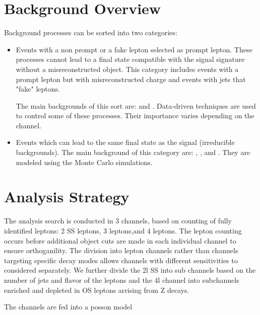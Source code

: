 \section{Background Overview}

Background processes can be sorted into two categories:

\begin{itemize}

\item Events with a non prompt or a fake lepton selected as prompt
  lepton. These processes cannot lead to a final state compatible with the
  signal signature without a misreconstructed object. This category includes
  events with a prompt lepton but with misreconstructed charge and events
  with jets that "fake" leptons. 

  The main backgrounds of this sort are: \ttbar and \zj.
  Data-driven techniques are used to control some of these processes.
  Their importance varies depending on the channel.

\item Events which can lead to the same final state as the signal (irreducible
  backgrounds).
 The main background of this category are: \ttV, \WZ, and \ZZ.
 They are modeled using the Monte Carlo simulations.

\end{itemize}


\section{Analysis Strategy} 


The analysis search is conducted in 3 channels, based on counting of fully identified
leptons: 2 SS leptons, 3 leptons,and 4 leptons. The lepton counting occurs before additional object cuts are made in each individual 
channel to ensure orthoganility. The division into lepton channels rather than channels targeting specific decay modes
allows channels with different sensitivities to considered separately. We further divide the 2l SS into sub channels
based on the number of jets and flavor of the leptons and the 4l channel into subchannels enriched and depleted in OS leptons arrising from Z decays. 

The channels are fed into a posson model 



